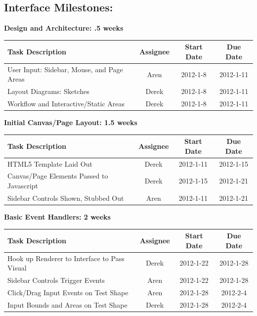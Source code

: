 \documentclass[12pt, letterpaper]{article}
\begin{document}
  \subsection{Interface Milestones:}
	
  \begin{center}
		{\bf Design and Architecture: .5 weeks}
    \begin{tabular}{| p{8.3cm} || c | c | c | }
      \hline
      Task Description & Assignee & Start Date & Due Date \\
      \hline
	    User Input: Sidebar, Mouse, and Page Areas & Aren & 2012-1-8 & 2012-1-11 \\
	    Layout Diagrams: Sketches & Derek & 2012-1-8 & 2012-1-11 \\
	    Workflow and Interactive/Static Areas & Derek & 2012-1-8 & 2012-1-11 \\
      \hline
    \end{tabular}
  \end{center}

  \begin{center}
		{\bf Initial Canvas/Page Layout: 1.5 weeks}
    \begin{tabular}{| p{8.3cm} || c | c | c | }
      \hline
      Task Description & Assignee & Start Date & Due Date \\
      \hline
	    HTML5 Template Laid Out & Derek & 2012-1-11 & 2012-1-15 \\
	    Canvas/Page Elements Passed to Javascript & Derek & 2012-1-15 & 2012-1-21 \\
	    Sidebar Controls Shown, Stubbed Out & Aren & 2012-1-11 & 2012-1-21 \\
      \hline
    \end{tabular}
  \end{center}

  \begin{center}
		{\bf Basic Event Handlers: 2 weeks}
    \begin{tabular}{| p{8.3cm} || c | c | c | }
      \hline
      Task Description & Assignee & Start Date & Due Date \\
      \hline
	    Hook up Renderer to Interface to Pass Visual & Derek & 2012-1-22 & 2012-1-28 \\
 	    Sidebar Controls Trigger Events & Aren & 2012-1-22 & 2012-1-28 \\
	    Click/Drag Input Events on Test Shape & Aren & 2012-1-28 & 2012-2-4 \\
	    Input Bounds and Areas on Test Shape & Derek & 2012-1-28 & 2012-2-4 \\
      \hline
    \end{tabular}
  \end{center}
\end{document}
